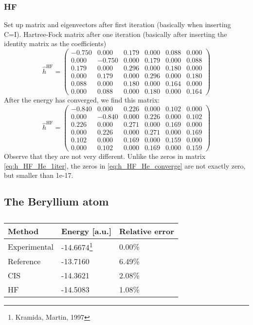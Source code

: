 \subsubsection{HF}
Set up matrix and eigenvectors after first iteration (basically when inserting C=I). 
Hartree-Fock matrix after one iteration (basically after inserting the identity matrix as the coefficients)
\begin{equation}
\hat{h}^{\text{HF}}=
\begin{pmatrix}
-0.750 & 0.000 & 0.179 & 0.000 & 0.088 & 0.000\\
0.000 & -0.750 & 0.000 & 0.179 & 0.000 & 0.088\\
0.179 & 0.000 & 0.296 & 0.000 & 0.180 & 0.000\\
0.000 & 0.179 & 0.000 & 0.296 & 0.000 & 0.180\\
0.088 & 0.000 & 0.180 & 0.000 & 0.164 & 0.000\\
0.000 & 0.088 & 0.000 & 0.180 & 0.000 & 0.164
\end{pmatrix}
\label{eq:h_HF_He_1iter}
\end{equation}
After the energy has converged, we find this matrix:
\begin{equation}
\hat{h}^{\text{HF}}=
\begin{pmatrix}
-0.840 & 0.000 & 0.226 & 0.000 & 0.102 & 0.000\\
0.000 & -0.840 & 0.000 & 0.226 & 0.000 & 0.102\\
0.226 & 0.000 & 0.271 & 0.000 & 0.169 & 0.000\\
0.000 & 0.226 & 0.000 & 0.271 & 0.000 & 0.169\\
0.102 & 0.000 & 0.169 & 0.000 & 0.159 & 0.000\\
0.000 & 0.102 & 0.000 & 0.169 & 0.000 & 0.159
\end{pmatrix}
\label{eq:h_HF_He_converge}
\end{equation}
Observe that they are not very different. Unlike the zeros in matrix \eqref{eq:h_HF_He_1iter}, the zeros in \eqref{eq:h_HF_He_converge} are not exactly zero, but smaller than 1e-17. 

\subsection{The Beryllium atom}

\begin{table} [H]
	\caption{}
	\begin{tabularx}{\textwidth}{X|X|X} \hline\hline
		\textbf{Method}&\textbf{Energy} [a.u.]&\textbf{Relative error}\\ \hline
		Experimental & -14.6674\footnote{Kramida, Martin, 1997} & 0.00\%  \\
		Reference & -13.7160 & 6.49\% \\
		CIS & -14.3621 &  2.08\% \\
		HF & -14.5083 & 1.08\% \\ \hline\hline
	\end{tabularx}
\end{table}

